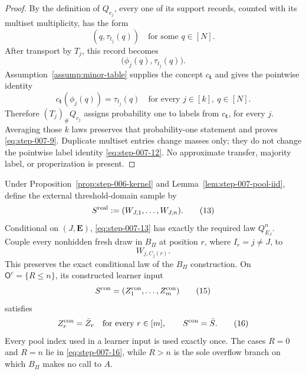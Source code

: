 \begin{proof}

By the definition of \(Q_{e_j}\), every one of its support records,
counted with its multiset multiplicity, has the form
\[
(q,\tau_{t_j}(q))
\quad\text{for some }q\in[N].
\tag{10}\label{eq:step-007-10}
\]
After transport by \(T_j\), this record becomes
\[
\bigl(\phi_j(q),\tau_{t_j}(q)\bigr).
\tag{11}\label{eq:step-007-11}
\]
Assumption~\ref{assump:minor-table} supplies the concept
\(c_{\mathbf t}\) and gives the pointwise identity
\[
c_{\mathbf t}(\phi_j(q))=\tau_{t_j}(q)
\quad
\text{for every }j\in[k],\ q\in[N].
\tag{12}\label{eq:step-007-12}
\]
Therefore \((T_j)_\#Q_{e_j}\) assigns probability one to labels from
\(c_{\mathbf t}\), for every \(j\).  Averaging those \(k\) laws
preserves that probability-one statement and proves \eqref{eq:step-007-9}.  Duplicate
multiset entries change masses only; they do not change the
pointwise label identity \eqref{eq:step-007-12}.  No approximate transfer, majority
label, or properization is present.

\end{proof}


\begin{lemma}
\label{lem:step-007-record-coupling}

Under Proposition~\ref{prop:step-006-kernel} and
Lemma~\ref{lem:step-007-pool-iid}, define the external threshold-domain
sample by
\[
S^{\rm real}
:=(W_{J,1},\ldots,W_{J,n}).
\tag{13}\label{eq:step-007-13}
\]
Conditional on \((J,\mathbf E)\), \eqref{eq:step-007-13} has exactly the required law
\(Q_{E_J}^n\).  Couple every nonhidden fresh draw in \(B_\Pi\) at
position \(r\), where \(I_r=j\ne J\), to
\[
W_{j,C_j(r)}.
\tag{14}\label{eq:step-007-14}
\]
This preserves the exact conditional law of the 
\(B_\Pi\) construction.  On
\(\mathsf O^c=\{R\le n\}\), its constructed learner input
\[
S^{\rm con}=(Z^{\rm con}_1,\ldots,Z^{\rm con}_m)
\tag{15}\label{eq:step-007-15}
\]
satisfies
\[
Z^{\rm con}_r=\bar Z_r
\quad\text{for every }r\in[m],
\qquad
S^{\rm con}=\bar S.
\tag{16}\label{eq:step-007-16}
\]
Every pool index used in a learner input is used exactly once.  The
cases \(R=0\) and \(R=n\) lie in \eqref{eq:step-007-16}, while \(R>n\) is the sole
overflow branch on which \(B_\Pi\) makes no call to \(A\).

\end{lemma}

